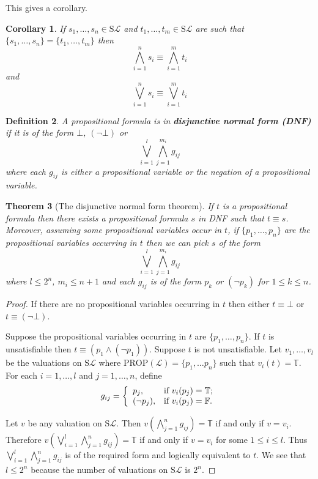 \documentclass[11pt]{article}
\newcommand{\PROP}{\mathrm{PROP}}
\newcommand{\PF}{\mathrm{S}}
\newtheorem{theorem}{Theorem}[section]
\newtheorem{cor}[theorem]{Corollary}
\newtheorem{definition}[theorem]{Definition}
\newcommand{\mcal}[1]{\mathcal{#1}}
\newcommand{\F}{\mathbb{F}}
\newcommand{\T}{\mathbb{T}}
\begin{document}
This gives a corollary.
\begin{cor}If $s_1,\ldots, s_n\in \PF\mcal{L}$ and $t_1,\ldots,t_m\in \PF\mcal{L}$ are such that $\{s_1,\ldots,s_n\}=\{t_1,\ldots,t_m\}$ then
\[\bigwedge_{i=1}^ns_i\equiv \bigwedge_{i=1}^mt_i\] and
\[\bigvee_{i=1}^ns_i\equiv \bigvee_{i=1}^mt_i\]
\end{cor}

\begin{definition}
A propositional formula is in \textbf{disjunctive normal form (DNF)} if it is of the form $\bot$, $(\neg\bot)$ or
\[\bigvee_{i=1}^l\bigwedge_{j=1}^{m_i} g_{ij}\] where each $g_{ij}$ is either a propositional variable or the negation of a propositional variable.
%
\end{definition}


\begin{theorem}[The disjunctive normal form theorem]
If $t$ is a propositional formula then there exists a propositional formula $s$ in DNF such that $t\equiv s$. Moreover, assuming some propositional variables occur in $t$, if $\{p_1,\ldots,p_n\}$ are the propositional variables occurring in $t$ then we can pick $s$ of the form
\[\bigvee_{i=1}^l\bigwedge_{j=1}^{m_i} g_{ij}\]
where $l\leq 2^n$, $m_i\leq n+1$ and each $g_{ij}$ is of the form $p_k$ or $(\neg p_k)$ for $1\leq k\leq n$.
\end{theorem}
\begin{proof}
If there are no propositional variables occurring in $t$ then either $t\equiv \bot$ or $t\equiv (\neg\bot)$.

Suppose the propositional variables occurring in $t$ are $\{p_1,\ldots,p_n\}$. If $t$ is unsatisfiable then $t\equiv (p_1\wedge (\neg p_1))$. Suppose $t$ is not unsatisfiable. Let $v_1,\ldots, v_l$ be the valuations on $\PF\mcal{L}$ where $\PROP(\mcal{L})=\{p_1,\ldots p_n\}$ such that $v_i(t)=\T$. For each $i=1,\ldots,l$ and $j=1,\ldots, n$, define
\[g_{ij}=\left\{
           \begin{array}{ll}
             p_j, & \hbox{if $v_i(p_j)=\T$;} \\
             (\neg p_j), & \hbox{if $v_i(p_j)=\F$.}
           \end{array}
         \right.
\]

Let $v$ be any valuation on $\PF\mcal{L}$.
Then $v(\bigwedge_{j=1}^{n} g_{ij})=\T$ if and only if $v=v_i$. Therefore $v(\bigvee_{i=1}^l\bigwedge_{j=1}^{n} g_{ij})=\T$ if and only if $v=v_i$ for some $1\leq i\leq l$. Thus $\bigvee_{i=1}^l\bigwedge_{j=1}^{n} g_{ij}$ is of the required form and logically equivalent to $t$. We see that $l\leq 2^n$ because the number of valuations on $\PF\mcal{L}$ is $2^n$.
\end{proof}
\end{document}
